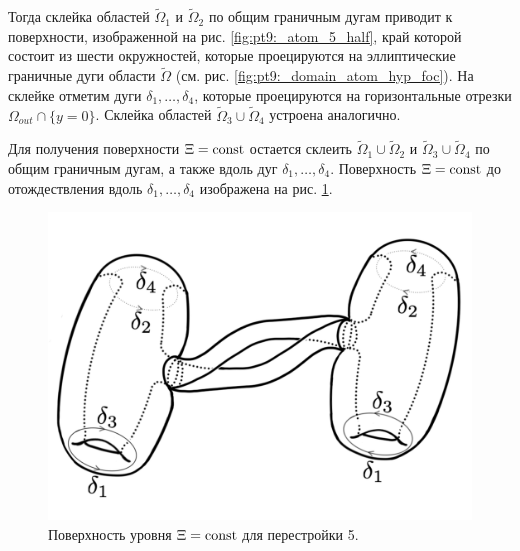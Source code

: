 Тогда склейка областей $\widetilde{\Omega}_1$ и $\widetilde{\Omega}_2$ по общим граничным дугам приводит к поверхности, изображенной на рис. \ref{fig:pt9:_atom_5_half}, край которой состоит из шести окружностей, которые проецируются на эллиптические граничные дуги области $\widetilde{\Omega}$ (см. рис. \ref{fig:pt9:_domain_atom_hyp_foc}). На склейке отметим дуги  $\delta_1, \ldots, \delta_4$, которые проецируются на горизонтальные отрезки $\Omega_{out} \cap \{y=0\}$.
Склейка областей $\widetilde{\Omega}_3 \cup \widetilde{\Omega}_4$ устроена аналогично. 

Для получения поверхности $\Xi = \mathrm{const}$ остается склеить $\widetilde{\Omega}_1 \cup \widetilde{\Omega}_2$ и $\widetilde{\Omega}_3 \cup \widetilde{\Omega}_4$ по общим граничным дугам, а также вдоль дуг $\delta_1, \ldots, \delta_4$. Поверхность $\Xi = \mathrm{const}$ до отождествления вдоль  $\delta_1, \ldots, \delta_4$ изображена на рис. \ref{fig:pt9:_atom_5}.

\begin{figure}[!htb]
\centering
\includegraphics[scale=0.125]{images/section2/atoms/atom_5.pdf}
    \caption{Поверхность уровня $\Xi = \mathrm{const}$ для перестройки 5.}
    \label{fig:pt9:_atom_5}
\end{figure}



